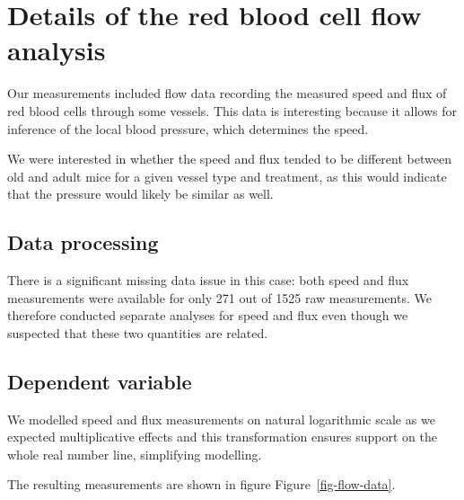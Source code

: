 \documentclass[
  letterpaper,
  DIV=11,
  numbers=noendperiod,
  oneside]{scrartcl}
\theoremstyle{plain}
\theoremstyle{remark}
\begin{document}
\section{Details of the red blood cell flow
analysis}\label{details-of-the-red-blood-cell-flow-analysis}

Our measurements included flow data recording the measured speed and
flux of red blood cells through some vessels. This data is interesting
because it allows for inference of the local blood pressure, which
determines the speed.

We were interested in whether the speed and flux tended to be different
between old and adult mice for a given vessel type and treatment, as
this would indicate that the pressure would likely be similar as well.

\subsection{Data processing}\label{data-processing-1}

There is a significant missing data issue in this case: both speed and
flux measurements were available for only 271 out of 1525 raw
measurements. We therefore conducted separate analyses for speed and
flux even though we suspected that these two quantities are related.

\subsection{Dependent variable}\label{dependent-variable-2}

We modelled speed and flux measurements on natural logarithmic scale as
we expected multiplicative effects and this transformation ensures
support on the whole real number line, simplifying modelling.

The resulting measurements are shown in figure
Figure~\ref{fig-flow-data}.
\end{document}
